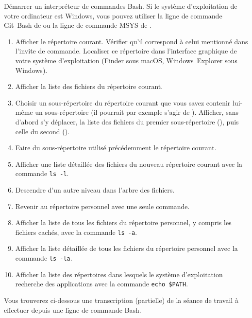\begin{exercice}
  Démarrer un interpréteur de commandes Bash. Si le système
  d'exploitation de votre ordinateur est Windows, vous pouvez utiliser
  la ligne de commande Git~Bash de
   ou la
  ligne de commande MSYS de
  .
  \begin{enumerate}
  \item Afficher le répertoire courant. Vérifier qu'il correspond à
    celui mentionné dans l'invite de commande. Localiser ce répertoire
    dans l'interface graphique de votre système d'exploitation (Finder
    sous macOS, Windows~Explorer sous Windows).
  \item Afficher la liste des fichiers du répertoire courant.
  \item Choisir un sous-répertoire du répertoire courant que vous
    savez contenir lui-même un sous-répertoire (il pourrait par
    exemple s'agir de ). Afficher, sans d'abord
    s'y déplacer, la liste des fichiers du premier sous-répertoire
    (), puis celle du second ().
  \item Faire du sous-répertoire utilisé précédemment le répertoire
    courant.
  \item Afficher une liste détaillée des fichiers du nouveau
    répertoire courant avec la commande \verb=ls -l=.
  \item Descendre d'un autre niveau dans l'arbre des fichiers.
  \item Revenir au répertoire personnel avec une seule commande.
  \item Afficher la liste de tous les fichiers du répertoire
    personnel, y compris les fichiers cachés, avec la commande
    \verb=ls -a=.
  \item Afficher la liste détaillée de tous les fichiers du répertoire
    personnel avec la commande \verb=ls -la=.
  \item Afficher la liste des répertoires dans lesquels le système
    d'exploitation recherche des applications avec la commande
    \verb=echo $PATH=.
  \end{enumerate}
  \begin{sol}
    Vous trouverez ci-dessous une transcription (partielle) de la
    séance de travail à effectuer depuis une ligne de commande Bash.
    \begin{Schunk}
\begin{Verbatim}[commandchars=\\\{\}]

\end{Verbatim}
\end{Schunk}
\end{sol}
\end{exercice}
